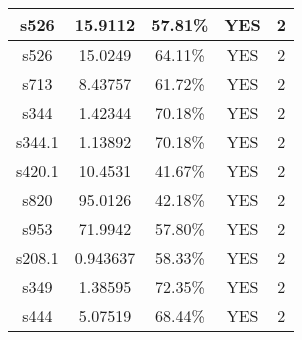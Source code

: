 \documentclass[a4paper,11pt]{article}
\begin{document}
\begin{center}
\begin{tabular}{||c c c c c||}
 s526 & 15.9112 & 57.81\% & YES  & 2 \\ 
\hline
 s526 & 15.0249 & 64.11\% & YES  & 2 \\ 
\hline
 s713 & 8.43757 & 61.72\% & YES  & 2 \\ 
\hline
 s344 & 1.42344 & 70.18\% & YES  & 2 \\ 
\hline
 s344.1 & 1.13892 & 70.18\% & YES  & 2 \\ 
\hline
 s420.1 & 10.4531 & 41.67\% & YES  & 2 \\ 
\hline
 s820 & 95.0126 & 42.18\% & YES  & 2 \\ 
\hline
 s953 & 71.9942 & 57.80\% & YES  & 2 \\ 
\hline
 s208.1 & 0.943637 & 58.33\% & YES  & 2 \\ 
\hline
 s349 & 1.38595 & 72.35\% & YES  & 2 \\ 
\hline
 s444 & 5.07519 & 68.44\% & YES  & 2 \\ 
\hline
\end{tabular}
\end{center}
\end{document}
